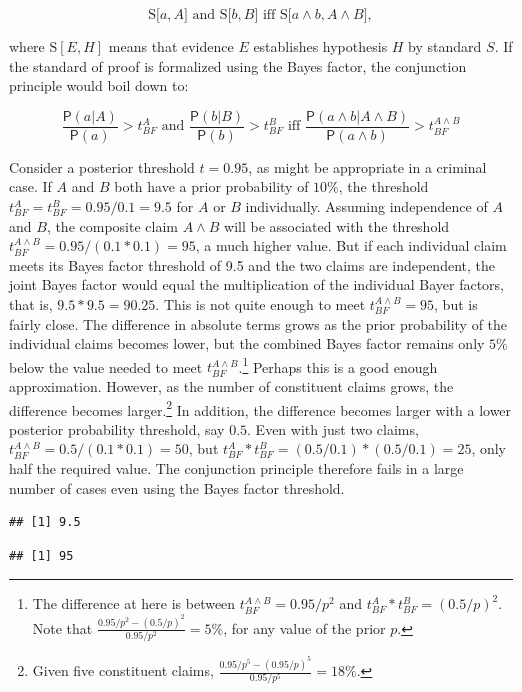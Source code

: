 \documentclass[10pt,dvipsnames,enabledeprecatedfontcommands]{scrartcl}
\newcommand{\et}{\wedge}
\newcommand{\pr}[1]{\mathsf{P}(#1)}
\begin{document}
\[\text{S[$a, A$] and S[$b, B$] iff S[$a \wedge b, A\wedge B$]},\]

\noindent where \(\text{S}[E, H]\) means that evidence \(E\) establishes
hypothesis \(H\) by standard \(S\). If the standard of proof is
formalized using the Bayes factor, the conjunction principle would boil
down to:

\[  \text{ $\frac{\pr{a | A }}{\pr{a}}>t^A_{BF}$ and $\frac{\pr{ b | B}}{\pr{b}}>t^B_{BF}$ iff $\frac{\pr{a \et b | A \et B}}{\pr{a \et b}}>t^{A\wedge B}_{BF}$ } \]

\noindent Consider a posterior threshold \(t=0.95\), as might be
appropriate in a criminal case. If \(A\) and \(B\) both have a prior
probability of \(10\%\), the threshold
\(t^A_{BF}=t_{BF}^B=0.95/0.1=9.5\) for \(A\) or \(B\) individually.
Assuming independence of \(A\) and \(B\), the composite claim
\(A \wedge B\) will be associated with the threshold
\(t^{A\wedge B}_{BF}=0.95/(0.1*0.1)=95\), a much higher value. But if
each individual claim meets its Bayes factor threshold of 9.5 and the
two claims are independent, the joint Bayes factor would equal the
multiplication of the individual Bayer factors, that is,
\(9.5*9.5=90.25\). This is not quite enough to meet
\(t^{A\wedge B}_{BF}=95\), but is fairly close. The difference in
absolute terms grows as the prior probability of the individual claims
becomes lower, but the combined Bayes factor remains only \(5\%\) below
the value needed to meet
\(t_{BF}^{A\wedge B}\).\footnote{The difference at here is between $t_{BF}^{A\wedge B}=0.95/p^2$ and $t_{BF}^{A}*t_{BF}^{B}=(0.5/p)^{2}$. Note that $\frac{0.95/p^2 - (0.5/p)^{2}}{0.95/p^2}=5\%$, for any value of the prior $p$.}
Perhaps this is a good enough approximation. However, as the number of
constituent claims grows, the difference becomes
larger.\footnote{Given five constituent claims, $\frac{0.95/p^5 - (0.95/p)^{5}}{0.95/p^5}=18\%$.}
In addition, the difference becomes larger with a lower posterior
probability threshold, say \(0.5\). Even with just two claims,
\(t^{A\wedge B}_{BF}=0.5/(0.1*0.1)=50\), but
\(t^A_{BF}*t_{BF}^B=(0.5/0.1)*(0.5/0.1)=25\), only half the required
value. The conjunction principle therefore fails in a large number of
cases even using the Bayes factor threshold.

\begin{verbatim}
## [1] 9.5
\end{verbatim}

\begin{verbatim}
## [1] 95
\end{verbatim}
\end{document}
